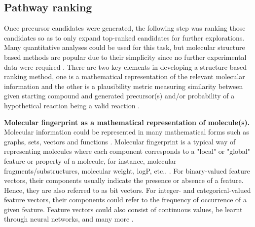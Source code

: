 \documentclass{article}
\begin{document}
\subsection{Pathway ranking} \label{sec:SI-PR}
Once precursor candidates were generated, the following step was ranking those candidates so as to only expand top-ranked candidates for further explorations. 
Many quantitative analyses could be used for this task, but molecular structure based methods are popular due to their simplicity since no further experimental data were required \citep{coley2017prediction}. 
There are two key elements in developing a structure-based ranking method, one is a mathematical representation of the relevant molecular information and the other is a plausibility metric measuring similarity between given starting compound and generated precursor(s) and/or probability of a hypothetical reaction being a valid reaction \citep{maggiora2004molecular, maggiora2011molecular, maggiora2014molecular}. 

\textbf{Molecular fingerprint as a mathematical representation of molecule(s).} 
Molecular information could be represented in many mathematical forms such as graphs, sets, vectors and functions \citep{maggiora2011molecular}. 
Molecular fingerprint is a typical way of representing molecules where each component corresponds to a "local" or "global" feature or property of a molecule, for instance, molecular fragments/substructures, molecular weight, logP, etc.. \citep{maggiora2011molecular}.
For binary-valued feature vectors, their components usually indicate the presence or absence of a feature. Hence, they are also referred to as bit vectors. 
For integer- and categorical-valued feature vectors, their components could refer to the frequency of occurrence of a given feature. 
Feature vectors could also consist of continuous values, be learnt through neural networks, and many more \citep{maggiora2014molecular, rogers2010extended, duvenaud2015convolutional, riniker2013open, duan2010analysis, kearnes2016molecular, coley2017convolutional}. 
\end{document}
